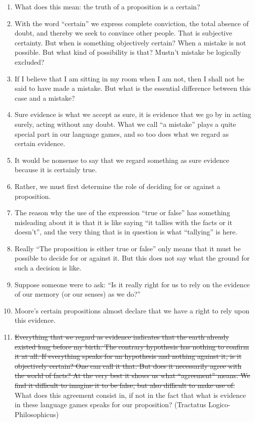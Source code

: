 \documentclass{book}
\begin{document}
\begin{enumerate}
\item
What does this mean: the truth of a proposition is a certain?

\item
With the word ``certain'' we express complete conviction, the total absence of
doubt, and thereby we seek to convince other people. That is subjective
certainty.  But when is something objectively certain? When a mistake is not
possible. But what kind of possibility is that? Mustn't mistake be logically
excluded?

\item
If I believe that I am sitting in my room when I am not, then I shall not be
said to have made a mistake. But what is the essential difference between this
case and a mistake?

\item
Sure evidence is what we accept as sure, it is evidence that we go by in acting
surely, acting without any doubt.  What we call ``a mistake'' plays a quite
special part in our language games, and so too does what we regard as certain
evidence.

\item
It would be nonsense to say that we regard something as sure evidence because
it is certainly true.

\item
Rather, we must first determine the role of deciding for or against a
proposition.

\item
The reason why the use of the expression ``true or false'' has something
misleading about it is that it is like saying ``it tallies with the facts or it
doesn't'', and the very thing that is in question is what ``tallying'' is here.

\item
Really ``The proposition is either true or false'' only means that it must be
possible to decide for or against it. But this does not say what the ground for
such a decision is like.

\item
Suppose someone were to ask: ``Is it really right for us to rely on the
evidence of our memory (or our senses) as we do?''

\item
Moore's certain propositions almost declare that we have a right to rely upon
this evidence.

\item
\st{Everything that we regard as evidence indicates that the earth already existed
long before my birth. The contrary hypothesis has nothing to confirm it at all.
If everything speaks for an hypothesis and nothing against it, is it
objectively certain? One can call it that. But does it necessarily agree with
the world of facts? At the very best it shows us what ``agreement'' means. We
find it difficult to imagine it to be false, but also difficult to make use
of.} What does this agreement consist in, if not in the fact
that what is evidence in these language games speaks for our proposition?
(Tractatus Logico-Philosophicus)


\end{enumerate}
\end{document}
